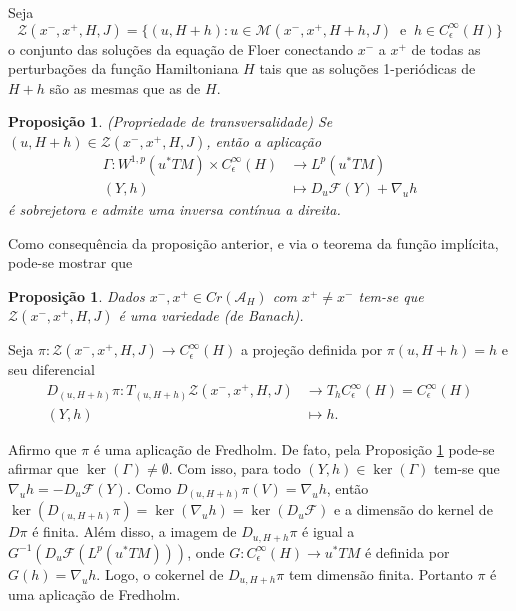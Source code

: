 \documentclass[12pt]{book}
\newtheorem{proposicao}[teorema]{Proposição}
\newcommand{\diferencialfloerponto}[1]{D_{#1}\operadorFloer}
\newcommand{\energiafinitaM}{\mathcal{M}}
\newcommand{\energiafinitaMconectanteHamiltoniana}{\energiafinitaM(x^{-}, x^{+},H+h,J)}
\newcommand{\espacoLp}[1]{L^{p}(#1)}
\newcommand{\espacosobolev}[1]{W^{1,p}(#1)}
\newcommand{\funcionalH}{\mathcal{A}_{H}}
\newcommand{\operadorFloer}{\mathcal{F}}
\newcommand{\orbitasConectantesZ}{\mathcal{Z}(x^{-}, x^{+},H, J)}
\newcommand{\perturbacaoHamiltoniana}[1]{C^{\infty}_{\epsilon}(#1)}
\newcommand{\pontoscriticos}[1]{\textit{Cr}(#1)}
\newcommand{\pullbackfibradotangente}[2]{#1^{*}T#2}
\newcommand{\pullbackfibradotangenteM}[1]{\pullbackfibradotangente{#1}{M}}
\begin{document}
	Seja 
	$$
	\orbitasConectantesZ = \{ (u, H+h): u \in  \energiafinitaMconectanteHamiltoniana \;\;\text{e}\;\; h\in \perturbacaoHamiltoniana{H} \}
	$$
	o conjunto das soluções da equação de Floer conectando $x^{-}$ a $x^{+}$ de todas as perturbações da função Hamiltoniana $H$ tais que as soluções 1-periódicas de $H+h$ são as mesmas que as de $H$.
	
	\begin{proposicao}\label{proposicao_gamma_sobrejetora}
		(Propriedade de transversalidade) Se $(u, H+h) \in \orbitasConectantesZ$, então a aplicação 
		$$
		\begin{aligned}
		\Gamma:\espacosobolev{\pullbackfibradotangenteM{u}}\times \perturbacaoHamiltoniana{H} 
		&\to \espacoLp{\pullbackfibradotangenteM{u}}
		\\
		(Y, h) 
		&\mapsto \diferencialfloerponto{u}(Y) + \nabla_{u}h
		\end{aligned}
		$$
		é sobrejetora e admite uma inversa contínua a direita.
	\end{proposicao}
	
	Como consequência da proposição anterior, e via o teorema da função implícita, pode-se mostrar que
	
	\begin{proposicao}\label{proposicao_orbitasConectantesZ}
		Dados $x^{-},x^{+}\in \pontoscriticos{\funcionalH}$ com $x^{+}\neq  x^{-}$ tem-se que $\orbitasConectantesZ$ é uma variedade (de Banach). 
	\end{proposicao}
	
	Seja $\pi:\orbitasConectantesZ \to \perturbacaoHamiltoniana{H}$ a projeção definida por $\pi(u, H+h) = h$ e seu diferencial
	$$
	\begin{aligned}
	D_{(u,H+h)}\pi: T_{(u,H+h)}\orbitasConectantesZ 
	&\to T_{h}\perturbacaoHamiltoniana{H}=\perturbacaoHamiltoniana{H}
	\\
	(Y,h) &\mapsto h.
	\end{aligned}
	$$
	
	Afirmo que $\pi$ é uma aplicação de Fredholm. De fato, pela Proposição \ref{proposicao_gamma_sobrejetora} pode-se afirmar que $\ker(\Gamma)\neq \emptyset$. Com isso, para todo $(Y,h)\in\ker(\Gamma)$ tem-se que $\nabla_{u}h =- \diferencialfloerponto{u}(Y)$. Como $D_{(u,H+h)}\pi(V) = \nabla_{u} h$, então $\ker(D_{(u,H+h)}\pi) = \ker(\nabla_{u} h) = \ker(\diferencialfloerponto{u})$ e a dimensão do kernel de $D\pi$ é finita. Além disso, a imagem de $D_{u, H+h}\pi$ é igual a $G^{-1}(\diferencialfloerponto{u}(\espacoLp{\pullbackfibradotangenteM{u}}))$, onde $G:\perturbacaoHamiltoniana{H} \to \pullbackfibradotangenteM{u}$ é definida por $G(h) = \nabla_{u}h$. Logo, o cokernel de $D_{u, H+h}\pi$ tem dimensão finita. Portanto $\pi$ é uma aplicação de Fredholm.
\end{document}
